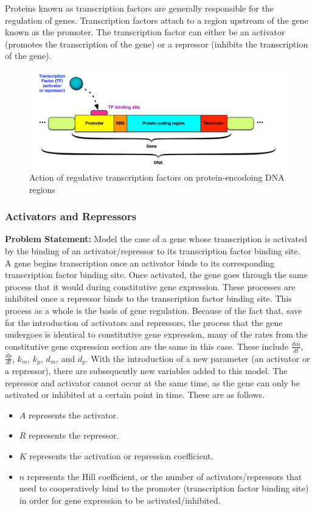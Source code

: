 Proteins known as transcription factors are generally responsible for the regulation of genes.
Transcription factors attach to a region upstream of the gene known as the promoter.
The transcription factor can either be an activator (promotes the transcription of the gene) or a repressor (inhibits the transcription of the gene). 

\begin{figure}[H]
    \centering
    \includegraphics[width=.5\textwidth]{pictures/diffeq/img3.png}
    \caption{Action of regulative transcription factors on protein-encodoing DNA regions}
\end{figure}

\subsubsection{Activators and Repressors}

\textbf{Problem Statement: } Model the case of a gene whose transcription is activated by the binding of an activator/repressor to its transcription factor binding site.\\

A gene begins transcription once an activator binds to its corresponding transcription factor binding site.
Once activated, the gene goes through the same process that it would during constitutive gene expression.
These processes are inhibited once a repressor binds to the transcription factor binding site.
This process as a whole is the basis of gene regulation.
Because of the fact that, save for the introduction of activators and repressors, the process that the gene undergoes is identical to constitutive gene expression, many of the rates from the constitutive gene expression section are the same in this case.
These include $\frac{dm}{dt}$, $\frac{dp}{dt}$, $k_{m}$, $k_{p}$, $d_{m}$, and $d_{p}$.
With the introduction of a new parameter (an activator or a repressor), there are subsequently new variables added to this model.
The repressor and activator cannot occur at the same time, as the gene can only be activated or inhibited at a certain point in time.
These are as follows.

\begin{itemize}
    \item $A$ represents the activator.
    \item $R$ represents the repressor.
    \item $K$ represents the activation or repression coefficient.
    \item $n$ represents the Hill coefficient, or the number of activators/repressors that need to cooperatively bind to the promoter (transcription factor binding site) in order for gene expression to be activated/inhibited.
\end{itemize}


